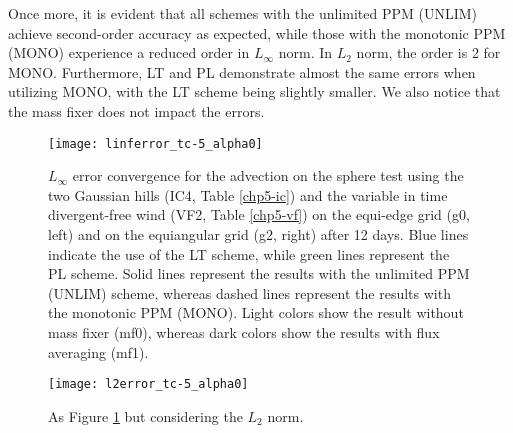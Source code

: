 Once more, it is evident that all schemes with the unlimited PPM (UNLIM) achieve second-order accuracy as expected, while those with the monotonic PPM (MONO) experience a reduced order 
in $L_{\infty}$ norm. In $L_{2}$ norm, the order is 2 for MONO.
Furthermore, LT and PL demonstrate almost the same errors when utilizing MONO, with the LT scheme being slightly smaller.
We also notice that the mass fixer does not impact the errors.
\newpage
\begin{figure}[!htb]
	\centering
	\texttt{[image: linferror\_tc-5\_alpha0]}
	\caption{
$L_{\infty}$ error convergence for the advection on the sphere test using the two Gaussian hills  (IC4, Table \ref{chp5-ic}) and the variable in time divergent-free wind
(VF2, Table \ref{chp5-vf}) on the equi-edge grid (g0, left) and on the equiangular grid (g2, right) after 12 days.
Blue lines indicate the use of the LT scheme, while green lines represent the PL scheme.
Solid lines represent the results with the unlimited PPM (UNLIM) scheme, whereas dashed lines represent the results with the monotonic PPM (MONO).
Light colors show the result without mass fixer (mf0), whereas dark colors show the results with flux averaging (mf1).
\label{chp-advcs-sec-exp-adv3-linf}}
\end{figure}

\begin{figure}[!htb]
	\centering
	\texttt{[image: l2error\_tc-5\_alpha0]}
	\caption{As Figure \ref{chp-advcs-sec-exp-adv3-linf} but considering the $L_2$ norm. \label{chp-advcs-sec-exp-adv3-l2}}
\end{figure}


\newpage
